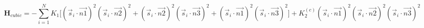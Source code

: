\documentclass[preview]{standalone}
\begin{document}
\begin{varwidth}{50in}
  \begin{equation}
    \bm{H}_{cubic} = -\sum_{{ i}=1}^{N} K_{1}
    \Big[
    \left(\vec{s}_{i} \cdot \vec{n1} \right)^2
    \left(\vec{s}_{i} \cdot \vec{n2} \right)^2 +
    \left(\vec{s}_{i} \cdot \vec{n2} \right)^2
    \left(\vec{s}_{i} \cdot \vec{n3} \right)^2 +
    \left(\vec{s}_{i} \cdot \vec{n1} \right)^2
    \left(\vec{s}_{i} \cdot \vec{n3} \right)^2 \Big]
    +K_{2}^{(c)} \left(\vec{s}_{i} \cdot \vec{n1} \right)^2
    \left(\vec{s}_{i} \cdot \vec{n2} \right)^2
    \left(\vec{s}_{i} \cdot \vec{n3} \right)^2 \nonumber
  \end{equation}
\end{varwidth}
\end{document}
